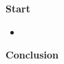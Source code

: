 \begin{frame}\textbf{Start}\vspace{0.5cm}

\begin{itemize}\setlength\itemsep{1em}
\item {}
\end{itemize}

\end{frame}
\begin{frame}\begin{center}
\LARGE\textbf{Conclusion}
\end{center}\end{frame}
